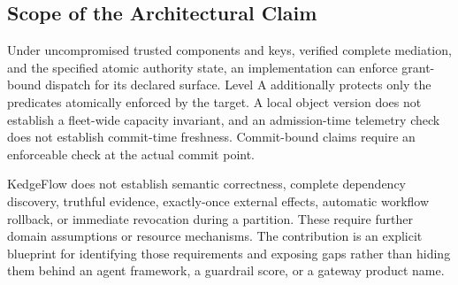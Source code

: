 \subsection{Scope of the Architectural Claim}

Under uncompromised trusted components and keys, verified complete mediation, and the specified atomic authority state, an implementation can enforce grant-bound dispatch for its declared surface. Level A additionally protects only the predicates atomically enforced by the target. A local object version does not establish a fleet-wide capacity invariant, and an admission-time telemetry check does not establish commit-time freshness. Commit-bound claims require an enforceable check at the actual commit point.

KedgeFlow does not establish semantic correctness, complete dependency discovery, truthful evidence, exactly-once external effects, automatic workflow rollback, or immediate revocation during a partition. These require further domain assumptions or resource mechanisms. The contribution is an explicit blueprint for identifying those requirements and exposing gaps rather than hiding them behind an agent framework, a guardrail score, or a gateway product name.
